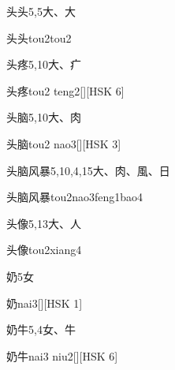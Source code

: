 \begin{Entry}{头头}{5,5}{⼤、⼤}
  \begin{Phonetics}{头头}{tou2tou2}
  \end{Phonetics}
\end{Entry}

\begin{Entry}{头疼}{5,10}{⼤、⽧}
  \begin{Phonetics}{头疼}{tou2 teng2}[][HSK 6]
  \end{Phonetics}
\end{Entry}

\begin{Entry}{头脑}{5,10}{⼤、⾁}
  \begin{Phonetics}{头脑}{tou2 nao3}[][HSK 3]
  \end{Phonetics}
\end{Entry}

\begin{Entry}{头脑风暴}{5,10,4,15}{⼤、⾁、⾵、⽇}
  \begin{Phonetics}{头脑风暴}{tou2nao3feng1bao4}
  \end{Phonetics}
\end{Entry}

\begin{Entry}{头像}{5,13}{⼤、⼈}
  \begin{Phonetics}{头像}{tou2xiang4}
  \end{Phonetics}
\end{Entry}

\begin{Entry}{奶}{5}{⼥}
  \begin{Phonetics}{奶}{nai3}[][HSK 1]
  \end{Phonetics}
\end{Entry}

\begin{Entry}{奶牛}{5,4}{⼥、⽜}
  \begin{Phonetics}{奶牛}{nai3 niu2}[][HSK 6]
  \end{Phonetics}
\end{Entry}

